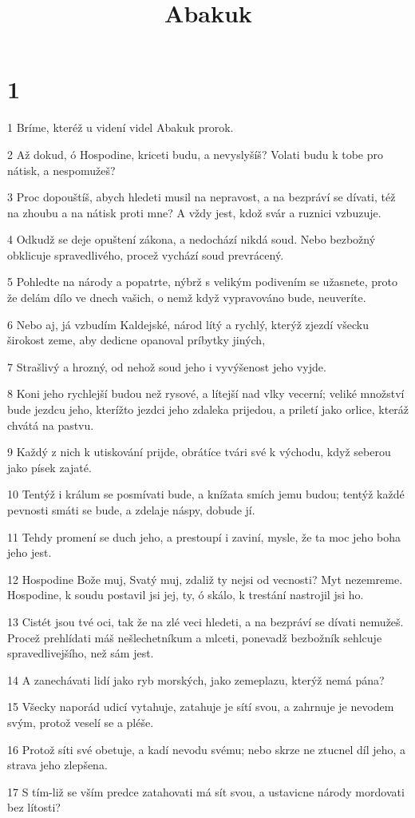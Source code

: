 

\title{Abakuk}

\chapter{1}

\par 1 Bríme, kteréž u videní videl Abakuk prorok.
\par 2 Až dokud, ó Hospodine, kriceti budu, a nevyslyšíš? Volati budu k tobe pro nátisk, a nespomužeš?
\par 3 Proc dopouštíš, abych hledeti musil na nepravost, a na bezpráví se dívati, též na zhoubu a na nátisk proti mne? A vždy jest, kdož svár a ruznici vzbuzuje.
\par 4 Odkudž se deje opuštení zákona, a nedochází nikdá soud. Nebo bezbožný obklicuje spravedlivého, procež vychází soud prevrácený.
\par 5 Pohledte na národy a popatrte, nýbrž s velikým podivením se užasnete, proto že delám dílo ve dnech vašich, o nemž když vypravováno bude, neuveríte.
\par 6 Nebo aj, já vzbudím Kaldejské, národ lítý a rychlý, kterýž zjezdí všecku širokost zeme, aby dedicne opanoval príbytky jiných,
\par 7 Strašlivý a hrozný, od nehož soud jeho i vyvýšenost jeho vyjde.
\par 8 Koni jeho rychlejší budou než rysové, a lítejší nad vlky vecerní; veliké množství bude jezdcu jeho, kterížto jezdci jeho zdaleka prijedou, a priletí jako orlice, kteráž chvátá na pastvu.
\par 9 Každý z nich k utiskování prijde, obrátíce tvári své k východu, když seberou jako písek zajaté.
\par 10 Tentýž i králum se posmívati bude, a knížata smích jemu budou; tentýž každé pevnosti smáti se bude, a zdelaje náspy, dobude jí.
\par 11 Tehdy promení se duch jeho, a prestoupí i zaviní, mysle, že ta moc jeho boha jeho jest.
\par 12 Hospodine Bože muj, Svatý muj, zdaliž ty nejsi od vecnosti? Myt nezemreme. Hospodine, k soudu postavil jsi jej, ty, ó skálo, k trestání nastrojil jsi ho.
\par 13 Cistét jsou tvé oci, tak že na zlé veci hledeti, a na bezpráví se dívati nemužeš. Procež prehlídati máš nešlechetníkum a mlceti, ponevadž bezbožník sehlcuje spravedlivejšího, než sám jest.
\par 14 A zanechávati lidí jako ryb morských, jako zemeplazu, kterýž nemá pána?
\par 15 Všecky naporád udicí vytahuje, zatahuje je sítí svou, a zahrnuje je nevodem svým, protož veselí se a pléše.
\par 16 Protož síti své obetuje, a kadí nevodu svému; nebo skrze ne ztucnel díl jeho, a strava jeho zlepšena.
\par 17 S tím-liž se vším predce zatahovati má sít svou, a ustavicne národy mordovati bez lítosti?

